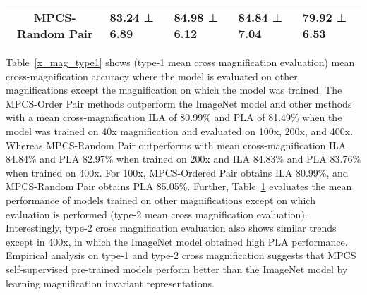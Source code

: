 \documentclass[conference]{IEEEtran}
\begin{document}
\begin{table}[h]
{\begin{tabular}{c|llll}
MPCS-Random Pair              & \multicolumn{1}{l|}{{\color[HTML]{444444} \textbf{83.24 ±   6.89}}}              & \multicolumn{1}{l|}{{\color[HTML]{444444} \textbf{84.98 ±   6.12}}}               & \multicolumn{1}{l|}{{\color[HTML]{444444} \textbf{84.84 ±   7.04}}}               & {\color[HTML]{444444} 79.92 ±   6.53}                                            \\ \hline
\end{tabular} }
\label{x_mag_type2}
\end{table} Table~\ref{x_mag_type1} shows (type-1 mean cross magnification evaluation) mean cross-magnification accuracy where the model is evaluated on other magnifications except the magnification on which the model was trained.
The MPCS-Order Pair methods outperform the ImageNet model and other methods with a mean cross-magnification ILA of 80.99\% and PLA of 81.49\% when the model was trained on 40x magnification and evaluated on 100x, 200x, and 400x.
Whereas MPCS-Random Pair outperforms with mean cross-magnification ILA 84.84\% and PLA 82.97\% when trained on 200x and ILA 84.83\% and PLA 83.76\% when trained on 400x.
For 100x, MPCS-Ordered Pair obtains ILA 80.99\%, and MPCS-Random Pair obtains PLA 85.05\%.
Further, Table~\ref{x_mag_type2} evaluates the mean performance of models trained on other magnifications except on which evaluation is performed (type-2 mean cross magnification evaluation).
Interestingly, type-2 cross magnification evaluation also shows similar trends except in 400x, in which the ImageNet model obtained high PLA performance.
Empirical analysis on type-1 and type-2 cross magnification suggests that MPCS self-supervised pre-trained models perform better than the ImageNet model by learning magnification invariant representations.
\end{document}
